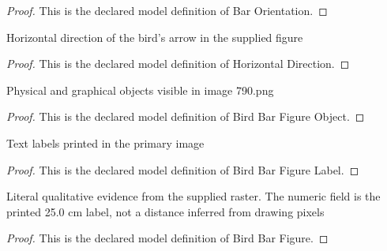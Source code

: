 \begin{proof}
  This is the declared model definition of Bar Orientation.
\end{proof}
\begin{definition}
  \label{def:physics:phyx-mini-0790:phyxminiproblems-problemphyxmini0790-horizontaldirection}
  Horizontal direction of the bird's arrow in the supplied figure
\end{definition}
\begin{proof}
  This is the declared model definition of Horizontal Direction.
\end{proof}
\begin{definition}
  \label{def:physics:phyx-mini-0790:phyxminiproblems-problemphyxmini0790-birdbarfigureobject}
  Physical and graphical objects visible in image 790.png
\end{definition}
\begin{proof}
  This is the declared model definition of Bird Bar Figure Object.
\end{proof}
\begin{definition}
  \label{def:physics:phyx-mini-0790:phyxminiproblems-problemphyxmini0790-birdbarfigurelabel}
  Text labels printed in the primary image
\end{definition}
\begin{proof}
  This is the declared model definition of Bird Bar Figure Label.
\end{proof}
\begin{definition}
  \label{def:physics:phyx-mini-0790:phyxminiproblems-problemphyxmini0790-birdbarfigure}
  Literal qualitative evidence from the supplied raster. The numeric field is the printed 25.0 cm label, not a distance inferred from drawing pixels
\end{definition}
\begin{proof}
  This is the declared model definition of Bird Bar Figure.
\end{proof}
